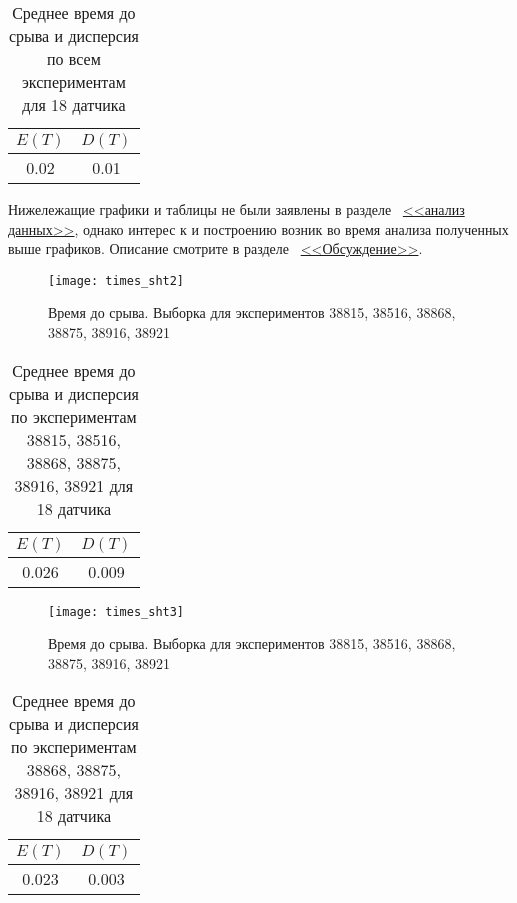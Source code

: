 \begin{table}[H]
\begin{center}
	\begin{tabular}{|c|c|}
		\hline
		$E(T)$ & $D(T)$ \\
		\hline
		0.02 & 0.01 \\
		\hline
	\end{tabular}
	\caption{Среднее время до срыва и дисперсия по всем экспериментам для 18 датчика}
	\label{table:dt}
\end{center}
\end{table}

Нижележащие графики и таблицы не были заявлены в разделе ~\hyperref[analysis]{<<анализ данных>>}, однако интерес к и построению возник во время анализа полученных выше графиков. Описание смотрите в разделе ~\hyperref[discuss]{<<Обсуждение>>}.

\begin{figure}[H]
	\begin{center}
		\texttt{[image: times\_sht2]}\label{pic:min2}
		\caption{Время до срыва. Выборка для экспериментов 38815, 38516, 38868, 38875, 38916, 38921}
	\end{center}
\end{figure}

\begin{table}[H]
	\begin{center}
		\begin{tabular}{|c|c|}
			\hline
			$E(T)$ & $D(T)$ \\
			\hline
			0.026 & 0.009 \\
			\hline
		\end{tabular}
		\caption{Среднее время до срыва и дисперсия по экспериментам 38815, 38516, 38868, 38875, 38916, 38921 для 18 датчика}
		\label{table:dt1}
	\end{center}
\end{table}

\begin{figure}[H]
	\begin{center}
		\texttt{[image: times\_sht3]}\label{pic:min3}
		\caption{Время до срыва. Выборка для экспериментов 38815, 38516, 38868, 38875, 38916, 38921}
	\end{center}
\end{figure}

\begin{table}[H]
	\begin{center}
		\begin{tabular}{|c|c|}
			\hline
			$E(T)$ & $D(T)$ \\
			\hline
			0.023 & 0.003 \\
			\hline
		\end{tabular}
		\caption{Среднее время до срыва и дисперсия по экспериментам 38868, 38875, 38916, 38921 для 18 датчика}
		\label{table:dt3}
	\end{center}
\end{table}
